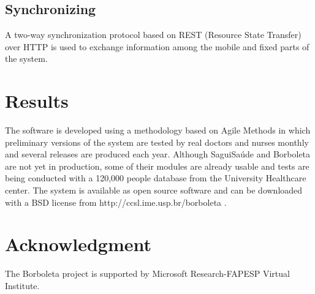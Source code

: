 \documentclass[12pt]{article}
\begin{document}
\subsection{Synchronizing}
A two-way synchronization protocol based on REST (Resource State Transfer) over HTTP is used to exchange information among the mobile and fixed parts of the system.




\section{Results}
The software is developed using a methodology based on Agile Methods in which preliminary versions of the system are tested by real doctors and nurses monthly and several releases are produced each year. Although SaguiSaúde and Borboleta are not yet in production, some of their modules are already usable and tests are being conducted with a 120,000 people database from the University Healthcare center. The system is available as open source software and can be downloaded with a BSD license from http://ccsl.ime.usp.br/borboleta .

\section{Acknowledgment}
The Borboleta project is supported by Microsoft Research-FAPESP Virtual Institute.



\end{document}
